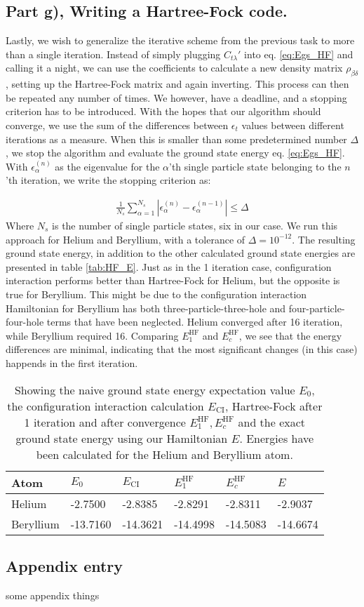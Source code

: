 \documentclass{article}
\newcommand{\hafo}[1]{#1^{\text{HF}}}
\begin{document}
\subsection*{Part g), Writing a Hartree-Fock code.}
    Lastly, we wish to generalize the iterative scheme from  the previous task to more than a single iteration. Instead of simply plugging $C_{t\lambda}'$ into eq. \eqref{eq:Egs_HF} and calling it a night, we can use the coefficients to calculate a new density matrix $\rho_{\beta\delta}$, setting up the Hartree-Fock matrix and again inverting. This process can then be repeated any number of times. We however, have a deadline, and a stopping criterion has to be introduced. With the hopes that our algorithm should converge, we use the sum of the differences between $\epsilon_t$ values between different iterations as a measure. When this is smaller than some predetermined number $\Delta$, we stop the algorithm and evaluate the ground state energy eq. \eqref{eq:Egs_HF}. With $\epsilon_\alpha^{(n)}$ as the eigenvalue for the $\alpha$'th single particle state belonging to the $n$'th iteration, we write the stopping criterion as:
    
    \begin{align*}
        \frac{1}{N_s}\sum_{\alpha=1}^{N_s} |\epsilon_\alpha^{(n)}-\epsilon_\alpha^{(n-1)}| \leq \Delta
    \end{align*}
    Where $N_s$ is the number of single particle states, six in our case. We run this approach for Helium and Beryllium, with a tolerance of $\Delta = 10^{-12}$. The resulting ground state energy, in addition to the other calculated ground state energies are presented in table \ref{tab:HF_E}. Just as in the 1 iteration case, configuration interaction performs better than Hartree-Fock for Helium, but the opposite is true for Beryllium. This might be due to the configuration interaction Hamiltonian for Beryllium has both three-particle-three-hole and four-particle-four-hole terms that have been neglected. Helium converged after 16 iteration, while Beryllium required 16. Comparing $\hafo{E_1}$ and $\hafo{E_c}$, we see that the energy differences are minimal, indicating that the most significant changes (in this case) happends in the first iteration. 

    \begin{table}[H]
        \centering
        \begin{tabular}{l|l|l|l|l|l}
        Atom      & $E_0$ & $E_{\text{CI}}$ & $\hafo{E_1}$ & $\hafo{E_c}$ & $E$ \\
        \hline
        Helium    & -2.7500     & -2.8385    & -2.8291 & -2.8311  & -2.9037    \\
        Beryllium & -13.7160     & -14.3621    & -14.4998 & -14.5083  &   -14.6674 
        \end{tabular}
        \caption{Showing the naive ground state energy expectation value $E_0$, the configuration interaction calculation $E_{\text{CI}}$, Hartree-Fock after 1 iteration and after convergence $\hafo{E_1}, \hafo{E_c}$ and the exact ground state energy using our Hamiltonian $E$. Energies have been calculated for the Helium and Beryllium atom. } \label{tab:ALL_E}
    \end{table}

\begin{appendix}
    \section{Appendix entry}
    some appendix things
\end{appendix}
\cite{DFTgap}
\printbibliography
\end{document}
